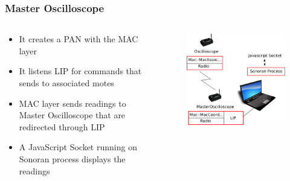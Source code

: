 \begin{frame}[fragile]
 \frametitle{Master Oscilloscope}
 \begin{columns}
    \begin{column}{.58\linewidth}
      \begin{itemize}
	\item It creates a PAN with the MAC layer
	\item It listens LIP for commands that sends to associated motes
	\item MAC layer sends readings to Master Oscilloscope that are redirected through LIP 
	\item A JavaScript Socket running on Sonoran process displays the readings
      \end{itemize}
  \end{column}
  \hfill
    \begin{column}{.4\linewidth}
      \begin{figure}
	\includegraphics[width=\textwidth]{img/oscilloscope.png}
      \end{figure}
    \end{column}
  \end{columns}
\end{frame}
